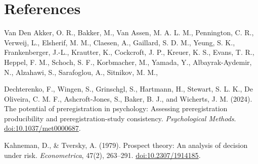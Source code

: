 \documentclass{article}
\begin{document}
\section*{References}

\noindent Van Den Akker, O. R., Bakker, M., Van Assen, M. A. L. M., Pennington, C. R.,
Verweij, L., Elsherif, M. M., Claesen, A., Gaillard, S. D. M., Yeung, S. K.,
Frankenberger, J.-L., Krautter, K., Cockcroft, J. P., Kreuer, K. S., Evans, T. R.,
Heppel, F. M., Schoch, S. F., Korbmacher, M., Yamada, Y., Albayrak-Aydemir, N.,
Alzahawi, S., Sarafoglou, A., Sitnikov, M. M.,

\newpage

\noindent Dechterenko, F., Wingen, S., Grinschgl, S., Hartmann, H., Stewart, S. L. K.,
De Oliveira, C. M. F., Ashcroft-Jones, S., Baker, B. J., and Wicherts, J. M. (2024).
The potential of preregistration in psychology: Assessing preregistration producibility
and preregistration-study consistency. \textit{Psychological Methods}.
\href{https://doi.org/10.1037/met0000687}{doi:10.1037/met0000687}.

\bigskip

\noindent Kahneman, D., \& Tversky, A. (1979). Prospect theory: An analysis of decision
under risk. \textit{Econometrica}, 47(2), 263--291.
\href{https://doi.org/10.2307/1914185}{doi:10.2307/1914185}.
\end{document}
